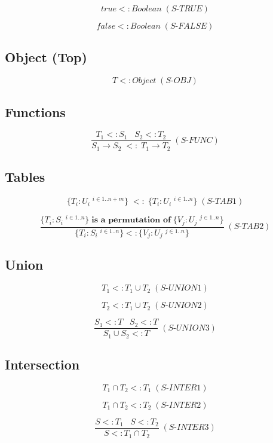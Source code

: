 \documentclass[12pt]{article}
\begin{document}
\[
true <: Boolean \; (\textit{S-TRUE})
\]

\[
false <: Boolean \; (\textit{S-FALSE})
\]

\subsection{Object (Top)}

\[
T <: Object \; (\textit{S-OBJ})
\]

\subsection{Functions}

\[
\frac{T_{1} <: S_{1} \;\;\; S_{2} <: T_{2}}
     {S_{1} \rightarrow S_{2} \; <: \; T_{1} \rightarrow T_{2}} \; (\textit{S-FUNC})
\]

\subsection{Tables}

\[
\{T_{i}:U_{i} \; ^{i \in 1..n+m}\} \;
<: \;
\{T_{i}:U_{i} \; ^{i \in 1..n}\} \; (\textit{S-TAB1})
\]

\[
\frac{\{T_{i}:S_{i} \; ^{i \in 1..n}\} \;
       \textbf{is a permutation of} \;
       \{V_{j}:U_{j} \; ^{j \in 1..n}\}}
     {\{T_{i}:S_{i} \; ^{i \in 1..n}\}
       <:
       \{V_{j}:U_{j} \; ^{j \in 1..n}\}} \; (\textit{S-TAB2})
\]

\subsection{Union}

\[
T_{1} <: T_{1} \cup T_{2} \; (\textit{S-UNION1})
\]

\[
T_{2} <: T_{1} \cup T_{2} \; (\textit{S-UNION2})
\]

\[
\frac{S_{1} <: T\;\;\; S_{2} <: T}
     {S_{1} \cup S_{2} <: T} \; (\textit{S-UNION3})
\]

\subsection{Intersection}

\[
T_{1} \cap T_{2} <: T_{1} \; (\textit{S-INTER1})
\]

\[
T_{1} \cap T_{2} <: T_{2} \; (\textit{S-INTER2})
\]

\[
\frac{S <: T_{1} \;\;\; S <: T_{2}}
     {S <: T_{1} \cap T_{2}} \; (\textit{S-INTER3})
\]
\end{document}

